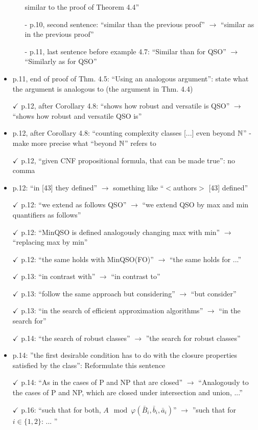 \begin{itemize}
\begin{itemize}
	similar to the proof of Theorem 4.4''	
	\item[-] p.10, second sentence: ``similar than the previous proof'' $\to$ ``similar as in the previous
	proof''
	\item[-] p.11, last sentence before example 4.7: ``Similar than for QSO'' $\to$ ``Similarly as for QSO''
	\end{itemize}
	\item p.11, end of proof of Thm. 4.5: ``Using an analogous argument'': state what the argument is
	analogous to (the argument in Thm. 4.4)
	\item[$\checkmark$] p.12, after Corollary 4.8: ``shows how robust and versatile is QSO'' $\to$ ``shows how robust and
	versatile QSO is''
	\item p.12, after Corollary 4.8: ``counting complexity classes [...] even beyond $\mathbb{N}$'' - make more precise
	what ``beyond $\mathbb{N}$'' refers to
	\item[$\checkmark$] p.12, ``given CNF propositional formula, that can be made true'': no comma
	\item p.12: ``in [43] they defined'' $\to$ something like ``$<$authors$>$ [43] defined''
	\item[$\checkmark$] p.12: ``we extend as follows QSO'' $\to$ ``we extend QSO by max and min quantifiers as follows''
	\item[$\checkmark$] p.12: ``MinQSO is defined analogously changing max with min'' $\to$ ``replacing max by min''
	\item[$\checkmark$] p.12: ``the same holds with MinQSO(FO)'' $\to$ ``the same holds for ...''
	\item[$\checkmark$] p.13: ``in contrast with'' $\to$ ``in contrast to''
	\item[$\checkmark$] p.13: ``follow the same approach but considering'' $\to$ ``but consider''
	\item[$\checkmark$] p.13: ``in the search of efficient approximation algorithms'' $\to$ ``in the search for''
	\item[$\checkmark$] p.14: ``the search of robust classes'' $\to$ ''the search for robust classes''
	\item p.14: ''the first desirable condition has to do with the closure properties satisfied by the class'':
	Reformulate this sentence
	\item[$\checkmark$] p.14: ``As in the cases of P and NP that are closed'' $\to$ ``Analogously to the cases of P and
	NP, which are closed under intersection and union, ...''
	\item[$\checkmark$] p.16: ``such that for both, $A\mod\varphi(\bar{B}_i,\bar{b}_i,\bar{a}_i)$'' $\to$ ''such that for $i \in \{1,2\}$: ... ''

\end{itemize}
